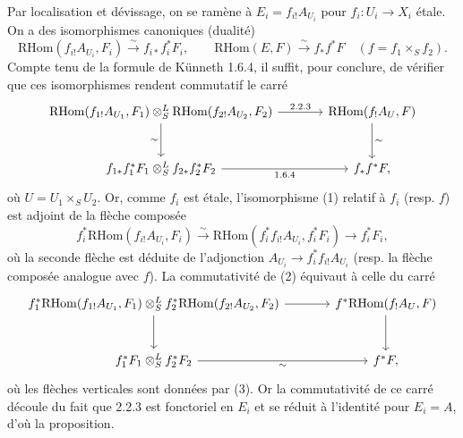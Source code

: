 \documentclass[11pt]{article}
\providecommand{\RHom}{\mathrm{RHom}}
\providecommand{\RHom}{\mathrm{RHom}}
\begin{document}
Par localisation et dévissage, on se ramène à $E_i=f_{i!}A_{U_i}$ pour $f_i:U_i\to X_i$ étale. On a des isomorphismes canoniques (dualité)
\begin{equation}\tag{1}
\RHom(f_{i!}A_{U_i},F_i)\xrightarrow{\sim}f_{i*}f_i^{*}F_i,
\qquad
\RHom(E,F)\xrightarrow{\sim}f_{*}f^{*}F\quad(f=f_1\times_S f_2).
\end{equation}
Compte tenu de la formule de Künneth 1.6.4, il suffit, pour conclure, de vérifier que ces isomorphismes rendent commutatif le carré
\[
\begin{tikzcd}[column sep=large,row sep=large]
\RHom(f_{1!}A_{U_1},F_1)\otimes^{L}_{S}\RHom(f_{2!}A_{U_2},F_2) \arrow[r,"2.2.3"] \arrow[d,"\sim"'] & \RHom(f_{!}A_U,F) \arrow[d,"\sim"]\\
f_{1*}f_1^{*}F_1\otimes^{L}_{S}f_{2*}f_2^{*}F_2 \arrow[r,"1.6.4"'] & f_{*}f^{*}F,
\end{tikzcd}
\]
où $U=U_1\times_S U_2$. Or, comme $f_i$ est étale, l'isomorphisme (1) relatif à $f_i$ (resp. $f$) est adjoint de la flèche composée
\begin{equation}\tag{3}
f_i^{*}\RHom(f_{i!}A_{U_i},F_i)\xrightarrow{\sim}\RHom(f_i^{*}f_{i!}A_{U_i},f_i^{*}F_i)\longrightarrow f_i^{*}F_i,
\end{equation}
où la seconde flèche est déduite de l'adjonction $A_{U_i}\to f_i^{*}f_{i!}A_{U_i}$ (resp. la flèche composée analogue avec $f$). La commutativité de (2) équivaut à celle du carré
\[
\begin{tikzcd}[column sep=large,row sep=large]
f_1^{*}\RHom(f_{1!}A_{U_1},F_1)\otimes^{L}_{S}f_2^{*}\RHom(f_{2!}A_{U_2},F_2) \arrow[r] \arrow[d] & f^{*}\RHom(f_{!}A_U,F) \arrow[d]\\
f_1^{*}F_1\otimes^{L}_{S}f_2^{*}F_2 \arrow[r,"\sim"'] & f^{*}F,
\end{tikzcd}
\]
où les flèches verticales sont données par (3). Or la commutativité de ce carré découle du fait que 2.2.3 est fonctoriel en $E_i$ et se réduit à l'identité pour $E_i=A$, d'où la proposition.
\end{document}
